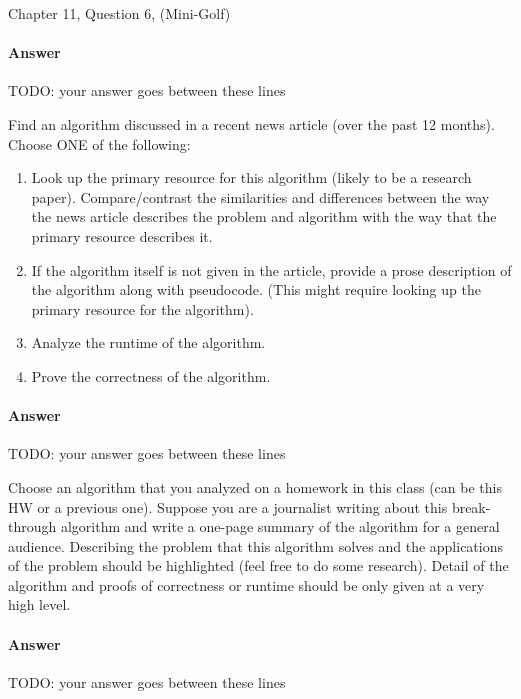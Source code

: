 \documentclass{article}
\begin{document}
Chapter 11, Question 6, (Mini-Golf)

\paragraph{Answer}


TODO: your answer goes between these lines


\nextprob
{}

Find an algorithm discussed in a recent news article (over the past 12 months).
Choose ONE of the following:
\begin{enumerate}
    \item Look up the primary resource for this algorithm (likely to be a
        research paper).  Compare/contrast the similarities and differences between the
        way the news article describes the problem and algorithm with the way
        that the primary resource describes it.
    \item If the algorithm itself is not given in the article, provide a prose
        description of the algorithm along with pseudocode. (This might require
        looking up the primary resource for the algorithm).
    \item Analyze the runtime of the algorithm.
    \item Prove the correctness of the algorithm.
\end{enumerate}

\paragraph{Answer}


TODO: your answer goes between these lines



\nextprob
{}

Choose an algorithm that you analyzed on a homework in this class (can be this
HW or a previous one).  Suppose you are a journalist writing about this
break-through algorithm and write a one-page summary of the algorithm for a
general audience.  Describing the problem that this algorithm solves and the
applications of the problem should be highlighted (feel free to do some
research).  Detail of the algorithm and proofs of correctness or runtime should
be only given at a very high level.

\paragraph{Answer}


TODO: your answer goes between these lines

\end{document}
